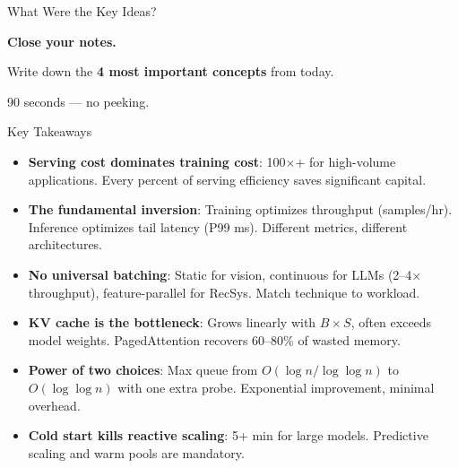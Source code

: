 \documentclass[aspectratio=169, 12pt]{beamer}
\begin{document}
\begin{frame}{What Were the Key Ideas?}

\centering
\vspace{1.5cm}
{\Large\bfseries Close your notes.}

\vspace{0.8cm}
{\large Write down the \textbf{4 most important concepts} from today.}

\vspace{0.8cm}
{\normalsize\textcolor{midgray}{90 seconds --- no peeking.}}

\end{frame}

\begin{frame}{Key Takeaways}

\footnotesize
\begin{itemize}\setlength\itemsep{1pt}
  \item \textbf{Serving cost dominates training cost}: 100$\times$+ for high-volume applications. Every percent of serving efficiency saves significant capital.
  \item \textbf{The fundamental inversion}: Training optimizes throughput (samples/hr). Inference optimizes tail latency (P99 ms). Different metrics, different architectures.
  \item \textbf{No universal batching}: Static for vision, continuous for LLMs (2--4$\times$ throughput), feature-parallel for RecSys. Match technique to workload.
  \item \textbf{KV cache is the bottleneck}: Grows linearly with $B \times S$, often exceeds model weights. PagedAttention recovers 60--80\% of wasted memory.
  \item \textbf{Power of two choices}: Max queue from $O(\log n/\log \log n)$ to $O(\log \log n)$ with one extra probe. Exponential improvement, minimal overhead.
  \item \textbf{Cold start kills reactive scaling}: 5+ min for large models. Predictive scaling and warm pools are mandatory.
\end{itemize}

\end{frame}
\end{document}
